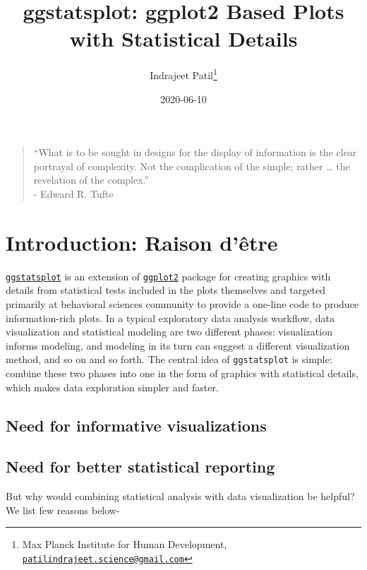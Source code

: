 \documentclass[
]{article}
\title{ggstatsplot: ggplot2 Based Plots with Statistical Details}
\author{Indrajeet Patil\footnote{Max Planck Institute for Human Development, \href{mailto:patilindrajeet.science@gmail.com}{\nolinkurl{patilindrajeet.science@gmail.com}}}}
\date{2020-06-10}
\begin{document}
\maketitle

{
\hypersetup{linkcolor=}
\setcounter{tocdepth}{2}
\tableofcontents
}
\begin{quote}
``What is to be sought in designs for the display of information is the clear
portrayal of complexity. Not the complication of the simple; rather \ldots{} the
revelation of the complex.''\\
- Edward R. Tufte
\end{quote}

\hypertarget{introduction-raison-duxeatre}{%
\section{Introduction: Raison d'être}\label{introduction-raison-duxeatre}}

\href{https://indrajeetpatil.github.io/ggstatsplot/}{\texttt{ggstatsplot}} is an extension
of \href{https://github.com/tidyverse/ggplot2}{\texttt{ggplot2}} package for creating
graphics with details from statistical tests included in the plots themselves
and targeted primarily at behavioral sciences community to provide a one-line
code to produce information-rich plots. In a typical exploratory data analysis
workflow, data visualization and statistical modeling are two different phases:
visualization informs modeling, and modeling in its turn can suggest a
different visualization method, and so on and so forth. The central idea of
\texttt{ggstatsplot} is simple: combine these two phases into one in the form of
graphics with statistical details, which makes data exploration simpler and
faster.

\hypertarget{need-for-informative-visualizations}{%
\subsection{Need for informative visualizations}\label{need-for-informative-visualizations}}

\hypertarget{need-for-better-statistical-reporting}{%
\subsection{Need for better statistical reporting}\label{need-for-better-statistical-reporting}}

But why would combining statistical analysis with data visualization be helpful?
We list few reasons below-
\end{document}
